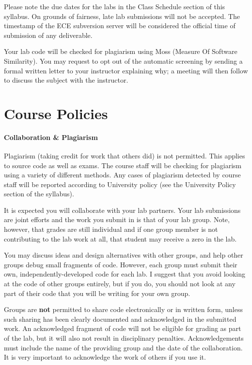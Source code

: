 \documentclass[letterpaper,10pt]{article}
\begin{document}
Please note the due dates for the labs in the Class Schedule section of this syllabus. On grounds of fairness, late lab submissions will not be accepted. The timestamp of the ECE subversion server will be considered the official time of submission of any deliverable.

Your lab code will be checked for plagiarism using Moss (Measure Of Software Similarity). You may request to opt out of the automatic screening by sending a formal written letter to your instructor explaining why; a meeting will then follow to discuss the subject with the instructor.

\section*{Course Policies}

\paragraph{Collaboration \& Plagiarism}

Plagiarism (taking credit for work that others did) is not permitted. This applies to source code as well as exams. The course staff will be checking for plagiarism using a variety of different methods. Any cases of plagiarism detected by course staff will be reported according to University policy (see the University Policy section of the syllabus).

It is expected you will collaborate with your lab partners. Your lab submissions are joint efforts and the work you submit in is that of your lab group. Note, however, that grades are still individual and if one group member is not contributing to the lab work at all, that student may receive a zero in the lab.

You may discuss ideas and design alternatives with other groups, and help other groups debug small fragments of code. However, each group must submit their own, independently-developed code for each lab. I suggest that you avoid looking at the code of other groups entirely, but if you do, you should not look at any part of their code that you will be writing for your own group.

Groups are \textbf{not} permitted to share code electronically or in written form, unless such sharing has been clearly documented and acknowledged in the submitted work. An acknowledged fragment of code will not be eligible for grading as part of the lab, but it will also not result in disciplinary penalties. Acknowledgements must include the name of the providing group and the date of the collaboration. It is very important to acknowledge the work of others if you use it.
\end{document}
